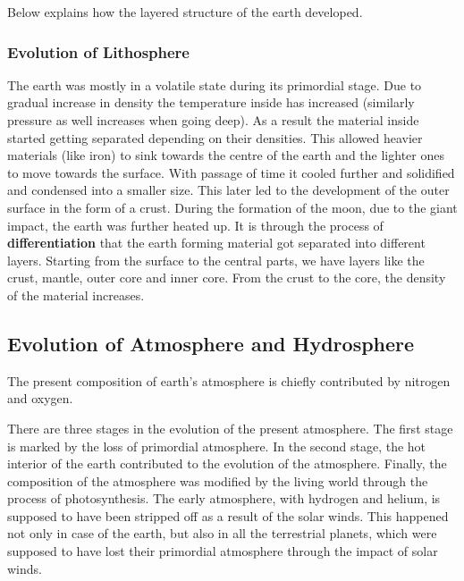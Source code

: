 \documentclass[8pt, a4paper, oneside, twocolumn]{extarticle}
\begin{document}
Below explains how the layered structure of the earth developed.
\subsubsection{Evolution of Lithosphere}
The earth was mostly in a volatile state during its primordial stage. Due to gradual increase in density the temperature inside has increased (similarly pressure as well increases when going deep). As a result the material inside started getting separated depending on their densities. This allowed heavier materials (like iron) to sink towards the centre of the earth and the lighter ones to move towards the surface. With passage of time it cooled further and solidified and condensed into a smaller size. This later led to the development of the outer surface in the form of a crust. During the formation of the moon, due to the giant impact, the earth was further heated up. It is through the process of \textbf{differentiation} that the earth forming material got separated into different layers. Starting from the surface to the central parts, we have layers like the crust, mantle, outer core and inner core. From the crust to the core, the density of the material increases.

\subsection{Evolution of Atmosphere and Hydrosphere}

The present composition of earth’s atmosphere is chiefly contributed by nitrogen and oxygen.

There are three stages in the evolution of the present atmosphere. The first stage is marked by the loss of primordial atmosphere. In the second stage, the hot interior of the earth contributed to the evolution of the atmosphere. Finally, the composition of the atmosphere was modified by the living world through the process of photosynthesis. The early atmosphere, with hydrogen and helium, is supposed to have been stripped off as a result of the solar winds. This happened not only in case of the earth, but also in all the terrestrial planets, which were supposed to have lost their primordial atmosphere through the impact of solar winds.
\end{document}
